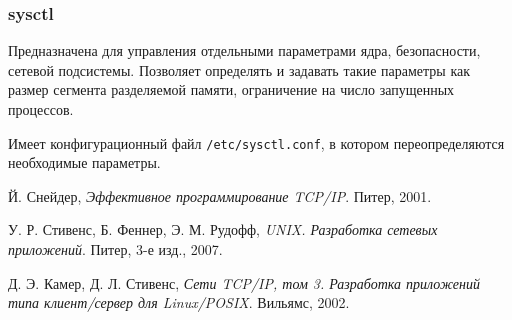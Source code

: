 \subsubsection{sysctl}
Предназначена для управления отдельными параметрами ядра, безопасности, сетевой подсистемы. Позволяет определять и задавать такие параметры как размер сегмента разделяемой памяти, ограничение на число запущенных процессов.

Имеет конфигурационный файл \texttt{/etc/sysctl.conf}, в котором переопределяются необходимые параметры.

\begin{thebibliography}{9}

  Й. Снейдер,
  \emph{Эффективное программирование TCP/IP}.
  Питер,
  2001.

  У. Р. Стивенс, Б. Феннер, Э. М. Рудофф,
  \emph{UNIX. Разработка сетевых приложений}.
  Питер,
  3-е изд.,
  2007.

  Д. Э. Камер, Д. Л. Стивенс,
  \emph{Сети TCP/IP, том 3. Разработка приложений типа клиент/сервер для Linux/POSIX}.
  Вильямс,
  2002.

\end{thebibliography}
